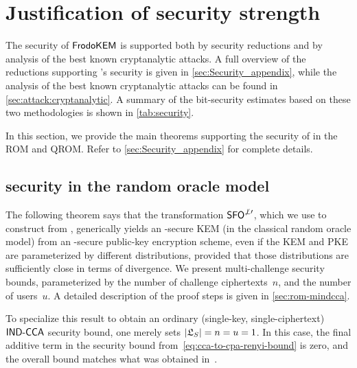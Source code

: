 \section{Justification of security strength}%
\label{sec:strength:justification}

The security of $\textsf{\upshape\mdseries FrodoKEM}$ is supported both by security reductions
and by analysis of the best known cryptanalytic attacks.
A full overview of the reductions supporting \FrodoKEM's security is given in \autoref{sec:Security_appendix},
while the analysis of the best known cryptanalytic attacks can be found in \autoref{sec:attack:cryptanalytic}.
A summary of the bit-security estimates based on these two methodologies is shown in \autoref{tab:security}.

In this section, we provide the main theorems supporting the security of \FrodoKEM
in the ROM and QROM. Refer to \autoref{sec:Security_appendix} for complete details.

\subsection{\MINDCCA security in the random oracle model}
\label{sec:strength:cca-kem} \label{sec:renyi_loss}

The following theorem says that the transformation $\textsf{\upshape\mdseries SFO}^{\not\perp\prime}$, which we use to construct \FrodoKEM from \FrodoPKE, generically yields an \MINDCCA-secure KEM (in the classical random oracle model) from an \MINDCPA-secure public-key encryption scheme, even if the KEM and PKE are parameterized by different distributions, provided that those distributions are sufficiently close in terms of \renyi divergence.
We present multi-challenge security bounds, parameterized by the number of challenge ciphertexts~$n$, and the number of users~$u$.
A detailed description of the proof steps is given in \autoref{sec:rom-mindcca}.

To specialize this result to obtain an ordinary (single-key, single-ciphertext) $\textsf{\upshape\mdseries IND-CCA}$ security bound, one merely sets $|\mathfrak{L}_{S}| = n = u = 1$.
In this case, the final additive term in the security bound from~\eqref{eq:cca-to-cpa-renyi-bound} is zero, and the overall bound matches what was obtained in~\cite{NISTPQC-R3:FrodoKEM20}.

    
